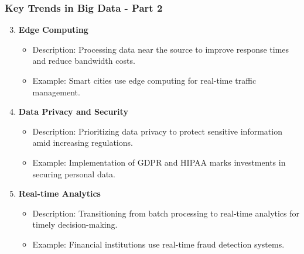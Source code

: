 \documentclass[aspectratio=169]{beamer}
\begin{document}
\begin{frame}[fragile]
    \frametitle{Key Trends in Big Data - Part 2}
    \begin{enumerate}
        \setcounter{enumi}{2}  %
        \item \textbf{Edge Computing}
            \begin{itemize}
                \item Description: Processing data near the source to improve response times and reduce bandwidth costs.
                \item Example: Smart cities use edge computing for real-time traffic management.
            \end{itemize}

        \item \textbf{Data Privacy and Security}
            \begin{itemize}
                \item Description: Prioritizing data privacy to protect sensitive information amid increasing regulations.
                \item Example: Implementation of GDPR and HIPAA marks investments in securing personal data.
            \end{itemize}

        \item \textbf{Real-time Analytics}
            \begin{itemize}
                \item Description: Transitioning from batch processing to real-time analytics for timely decision-making.
                \item Example: Financial institutions use real-time fraud detection systems.
            \end{itemize}
    \end{enumerate}
\end{frame}
\end{document}
